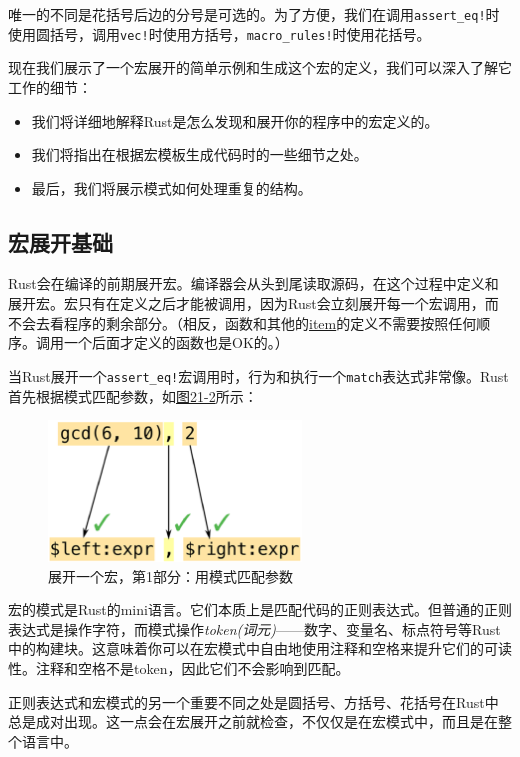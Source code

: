 唯一的不同是花括号后边的分号是可选的。为了方便，我们在调用\texttt{assert\_eq!}时使用圆括号，调用\texttt{vec!}时使用方括号，\texttt{macro\_rules!}时使用花括号。

现在我们展示了一个宏展开的简单示例和生成这个宏的定义，我们可以深入了解它工作的细节：
\begin{itemize}
    \item 我们将详细地解释Rust是怎么发现和展开你的程序中的宏定义的。
    \item 我们将指出在根据宏模板生成代码时的一些细节之处。
    \item 最后，我们将展示模式如何处理重复的结构。
\end{itemize}

\subsection{宏展开基础}
Rust会在编译的前期展开宏。编译器会从头到尾读取源码，在这个过程中定义和展开宏。宏只有在定义之后才能被调用，因为Rust会立刻展开每一个宏调用，而不会去看程序的剩余部分。（相反，函数和其他的\hyperref[static]{item}的定义不需要按照任何顺序。调用一个后面才定义的函数也是OK的。）

当Rust展开一个\texttt{assert\_eq!}宏调用时，行为和执行一个\texttt{match}表达式非常像。Rust首先根据模式匹配参数，如\hyperref[f21-2]{图21-2}所示：
\begin{figure}[htbp]
    \centering
    \includegraphics[width=0.6\textwidth]{../img/f21-2.png}
    \caption{展开一个宏，第1部分：用模式匹配参数}
    \label{f21-2}
\end{figure}

宏的模式是Rust的mini语言。它们本质上是匹配代码的正则表达式。但普通的正则表达式是操作字符，而模式操作\emph{token(词元)}——数字、变量名、标点符号等Rust中的构建块。这意味着你可以在宏模式中自由地使用注释和空格来提升它们的可读性。注释和空格不是token，因此它们不会影响到匹配。

正则表达式和宏模式的另一个重要不同之处是圆括号、方括号、花括号在Rust中总是成对出现。这一点会在宏展开之前就检查，不仅仅是在宏模式中，而且是在整个语言中。

